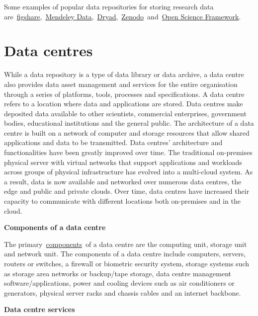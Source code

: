 \documentclass[
]{book}
\begin{document}
Some examples of popular data repositories for storing research data are~\href{https://figshare.com/}{figshare},~\href{https://data.mendeley.com/}{Mendeley Data},~\href{https://datadryad.org/stash}{Dryad},~\href{https://datadryad.org/stash}{Zenodo}~and~\href{https://osf.io/}{Open Science Framework}.

\hypertarget{data-centres}{%
\section{\texorpdfstring{\textbf{Data centres}}{Data centres}}\label{data-centres}}

While a data repository is a type of data library or data archive, a data centre also provides data asset management and services for the entire organisation through a series of platforms, tools, processes and specifications. A data centre refers to a location where data and applications are stored. Data centres make deposited data available to other scientists, commercial enterprises, government bodies, educational institutions and the general public. The architecture of a data centre is built on a network of computer and storage resources that allow shared applications and data to be transmitted. Data centres' architecture and functionalities have been greatly improved over time. The traditional on-premises physical server with virtual networks that support applications and workloads across groups of physical infrastructure has evolved into a multi-cloud system. As a result, data is now available and networked over numerous data centres, the edge and public and private clouds. Over time, data centres have increased their capacity to communicate with different locations both on-premises and in the cloud.

\textbf{Components of a data centre}

The primary~\href{https://centriq.com/blog/3-principles-of-data-center-infrastructure-design/}{}\href{https://centriq.com/blog/3-principles-of-data-center-infrastructure-design/}{components}~of a data centre are the computing unit, storage unit and network unit. The components of a data centre include computers, servers, routers or switches, a firewall or biometric security system, storage systems such as storage area networks or backup/tape storage, data centre management software/applications, power and cooling devices such as air conditioners or generators, physical server racks and chassis cables and an internet backbone.

\textbf{Data centre services}
\end{document}
